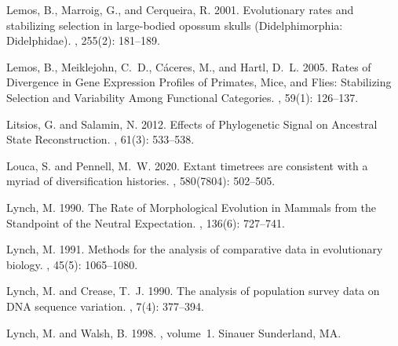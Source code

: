 \documentclass{article}
\begin{document}
\begin{thebibliography}{}
    Lemos, B., Marroig, G., and Cerqueira, R. 2001.
    \newblock Evolutionary rates and stabilizing selection in large-bodied opossum
    skulls ({{Didelphimorphia}}: {{Didelphidae}}).
    , {255}(2): 181--189.

    Lemos, B., Meiklejohn, C.~D., C{\'a}ceres, M., and Hartl, D.~L. 2005.
    \newblock Rates of {{Divergence}} in {{Gene Expression Profiles}} of
        {{Primates}}, {{Mice}}, and {{Flies}}: {{Stabilizing Selection}} and
        {{Variability Among Functional Categories}}.
    , {59}(1): 126--137.

    Litsios, G. and Salamin, N. 2012.
    \newblock Effects of {{Phylogenetic Signal}} on {{Ancestral State
    Reconstruction}}.
    , {61}(3): 533--538.

    Louca, S. and Pennell, M.~W. 2020.
    \newblock Extant timetrees are consistent with a myriad of diversification
    histories.
    , {580}(7804): 502--505.

    Lynch, M. 1990.
    \newblock The {{Rate}} of {{Morphological Evolution}} in {{Mammals}} from the
        {{Standpoint}} of the {{Neutral Expectation}}.
    , {136}(6): 727--741.

    Lynch, M. 1991.
    \newblock Methods for the analysis of comparative data in evolutionary biology.
    , {45}(5): 1065--1080.

    Lynch, M. and Crease, T.~J. 1990.
    \newblock The analysis of population survey data on {{DNA}} sequence variation.
    , {7}(4): 377--394.

    Lynch, M. and Walsh, B. 1998.
    , volume~1.
    \newblock Sinauer Sunderland, MA.


\end{thebibliography}
\end{document}
